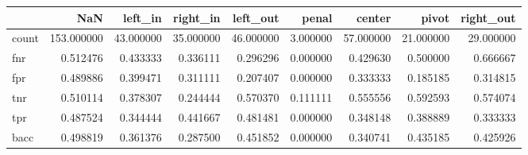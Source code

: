 \begin{tabular}{lrrrrrrrr}
\toprule
{} &         NaN &    left\_in &   right\_in &   left\_out &     penal &     center &      pivot &  right\_out \\
\midrule
count &  153.000000 &  43.000000 &  35.000000 &  46.000000 &  3.000000 &  57.000000 &  21.000000 &  29.000000 \\
fnr   &    0.512476 &   0.433333 &   0.336111 &   0.296296 &  0.000000 &   0.429630 &   0.500000 &   0.666667 \\
fpr   &    0.489886 &   0.399471 &   0.311111 &   0.207407 &  0.000000 &   0.333333 &   0.185185 &   0.314815 \\
tnr   &    0.510114 &   0.378307 &   0.244444 &   0.570370 &  0.111111 &   0.555556 &   0.592593 &   0.574074 \\
tpr   &    0.487524 &   0.344444 &   0.441667 &   0.481481 &  0.000000 &   0.348148 &   0.388889 &   0.333333 \\
bacc  &    0.498819 &   0.361376 &   0.287500 &   0.451852 &  0.000000 &   0.340741 &   0.435185 &   0.425926 \\
\bottomrule
\end{tabular}
